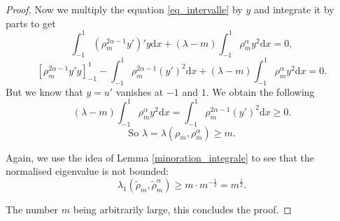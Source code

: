 \documentclass[12pt,reqno]{amsart}		%
\theoremstyle{plain}
\theoremstyle{definition}
\theoremstyle{remark}
\numberwithin{equation}{section}
\renewcommand{\d}{\mathrm{d}}
\begin{document}
\begin{proof}
	Now we multiply the equation \eqref{eq_intervalle} by $y$ and integrate it by parts to get
	\[
	\int_{-1}^1\left(\rho_m^{2\alpha-1}y'\right)'y \d x
	+\left(\lambda-m\right)\int_{-1}^1\rho_m^{\alpha}y^2\d x = 0,
	\]
	\[
	\left[\rho_m^{2\alpha-1}y'y\right]_{-1}^1 - \int_{-1}^1 \rho_m^{2\alpha-1}(y')^2\d x
	+\left(\lambda-m\right)\int_{-1}^1\rho_m^{\alpha}y^2\d x = 0.
	\]
	But we know that $y=u'$ vanishes at $-1$ and $1$. We obtain the following	
	\[
	\left(\lambda-m\right)\int_{-1}^1\rho_m^{\alpha}y^2 \d x
	= \int_{-1}^1 \rho_m^{2\alpha-1}(y')^2 \d x\geqslant 0.
	\]
	\begin{equation*}
		\text{So } \lambda=\lambda\left(\rho_m,\rho^{\alpha}_m\right) \geqslant m.
	\end{equation*}
	
	Again, we use the idea of Lemma \ref{minoration_integrale} to see that the normalised eigenvalue is not bounded:
	\begin{equation*}
	\lambda_{1}(\tilde{\rho}_{m},\tilde{\rho}_{m}^{\alpha})
	\geqslant
	m\cdot m^{-\frac{1}{2}} = m^{\frac{1}{2}}.
	\end{equation*}
	
	
%	
%	
	
	\bigskip
	The number $m$ being arbitrarily large, this concludes the proof.
\end{proof}







\label{lastpage}
\end{document}

